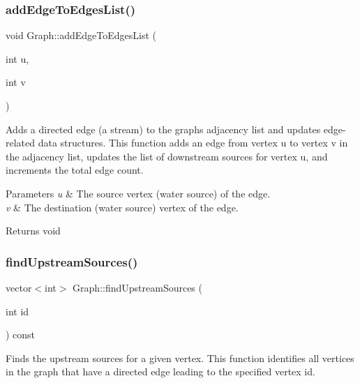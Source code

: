 \subsubsection{\texorpdfstring{add\+Edge\+To\+Edges\+List()}{addEdgeToEdgesList()}}
{\footnotesize\ttfamily void Graph\+::add\+Edge\+To\+Edges\+List (\begin{DoxyParamCaption}\item[{int}]{u,  }\item[{int}]{v }\end{DoxyParamCaption})\hspace{0.3cm}{\ttfamily [protected]}}



Adds a directed edge (a stream) to the graph\textquotesingle{}s adjacency list and updates edge-\/related data structures. This function adds an edge from vertex {\ttfamily u} to vertex {\ttfamily v} in the adjacency list, updates the list of downstream sources for vertex {\ttfamily u}, and increments the total edge count. 


\begin{DoxyParams}{Parameters}
{\em u} & The source vertex (water source) of the edge. \\
\hline
{\em v} & The destination (water source) vertex of the edge.\\
\hline
\end{DoxyParams}
\begin{DoxyReturn}{Returns}
void 
\end{DoxyReturn}
\mbox{\label{classGraph_a95b0b6a7689c519d38e820cc3f86fc70}} 
\subsubsection{\texorpdfstring{find\+Upstream\+Sources()}{findUpstreamSources()}}
{\footnotesize\ttfamily vector$<$int$>$ Graph\+::find\+Upstream\+Sources (\begin{DoxyParamCaption}\item[{int}]{id }\end{DoxyParamCaption}) const\hspace{0.3cm}{\ttfamily [protected]}}



Finds the upstream sources for a given vertex. This function identifies all vertices in the graph that have a directed edge leading to the specified vertex {\ttfamily id}. 


